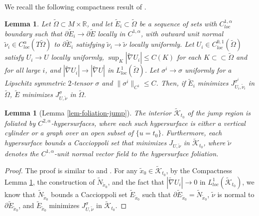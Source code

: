\documentclass[11pt, letterpaper]{amsart}
\newtheorem{lem}[thm]{Lemma}
\theoremstyle{definition}
\theoremstyle{remark}
\begin{document}
\begin{appendix}
We recall the following compactness result of \cite[Theorem 5.3]{HuiskenWolff22}.
\begin{lem}\label{lem-compactness}
	Let $\tilde{\Omega } \subset M \times \mathbb{R}$, and let $\tilde{E}_i \subset \tilde{\Omega }$ be a sequence of sets with $C^{1,\alpha }_{loc}$ boundary such that $\partial \tilde{E}_i \to \partial \tilde{E}$ locally in $C^{1,\alpha }$, with outward unit normal $\tilde{\nu} _i \in C^{\alpha }_{loc}(T \tilde{\Omega })$ to $\partial \tilde{E}_i$ satisfying $\tilde{\nu }_i \to \tilde{\nu }$ locally uniformly. Let $U_i \in C^{0,1}_{loc}(\tilde{\Omega })$ satisfy $U_i \to U$ locally uniformly,  $\sup_{K} |\tilde{\nabla} U_i| \leq C(K)$ for each $K \subset \subset \tilde{\Omega} $ and for all large $i$, and $|\tilde{\nabla }U_i| \to |\tilde{\nabla }U|$ in $L^{1}_{loc}(\tilde{\Omega })$. Let $\sigma ^{i} \to \sigma $ uniformly for a Lipschitz symmetric $2$-tensor $\sigma $ and $\|\sigma ^{i}\|_{C^1} \leq C$.
	Then, if $\tilde{E}_i$ minimizes $J_{U_i, \tilde{\nu }_i}^{\sigma ^{i}}$ in $\tilde{\Omega }$, $\tilde{E}$ minimizes $J_{U, \tilde{\nu }} ^{\sigma }$ in $\tilde{\Omega }$.
\end{lem}





\begin{lem}[Lemma \ref{lem-foliation-jump}]
	The interior $\tilde{\mathcal{K}}_{t_0}$ of the jump region is foliated by $C^{2,\alpha }$-hypersurfaces, where each such hypersurface is either a vertical cylinder or a graph over an open subset of $\{u=t_0\} $. Furthermore, each hypersurface bounds a Caccioppoli set that minimizes $J_{U, \tilde{\nu }}$ in $\tilde{\mathcal{K}}_{t_0}$, where $\tilde{\nu }$ denotes the $C^{1,\alpha }$-unit normal vector field to the hypersurface foliation. 
\end{lem}
\begin{proof}
	The proof is similar to \cite[Proposition 8]{Moore12} and \cite[Theorem 5.9]{HuiskenWolff22}. 
	For any $\tilde{x}_0 \in \tilde{\mathcal{K}}_{t_0}$, by the Compactness Lemma \ref{lem-compactness}, the construction of $\tilde{N}_{\tilde{x}_0}$, and the fact that $|\tilde{\nabla }U_i| \to 0$ in $L^{1}_{loc}(\tilde{\mathcal{K}}_{t_0})$, we know that $\tilde{N}_{\tilde{x}_0}$ bounds a Caccioppoli set $\tilde{E}_{\tilde{x}_0}$ such that $\partial \tilde{E}_{\tilde{x}_0}= \tilde{N}_{\tilde{x}_0}$, $\tilde{\nu }$ is normal to $\partial \tilde{E}_{\tilde{x}_0}$, and $\tilde{E}_{\tilde{x}_0}$ minimizes $J_{U, \tilde{\nu }} ^{\sigma }$ in $\tilde{\mathcal{K}}_{t_0}$. 


\end{proof}
\end{appendix}
\end{document}

